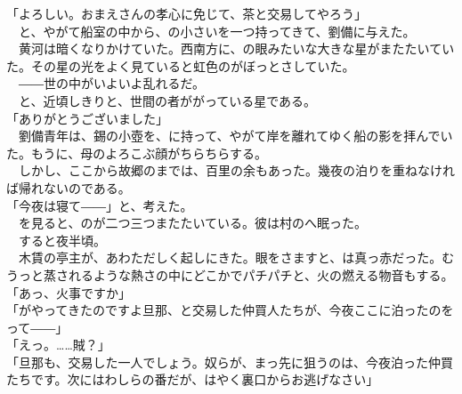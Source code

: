 \documentclass[
  paper=a5,
  fontsize=10pt,
  jafontsize=9.5pt,
  tate,                  %
  open_bracket_pos=nibu, %
]{jlreq}
\begin{document}
「よろしい。おまえさんの孝心に免じて、茶と交易してやろう」\\


　と、やがて船室の中から、の小さいを一つ持ってきて、劉備に与えた。\\


　黄河は暗くなりかけていた。西南方に、の眼みたいな大きな星がまたたいていた。その星の光をよく見ていると虹色のがぼっとさしていた。\\


　――世の中がいよいよ乱れるだ。\\


　と、近頃しきりと、世間の者ががっている星である。\\


「ありがとうございました」\\


　劉備青年は、錫の小壺を、に持って、やがて岸を離れてゆく船の影を拝んでいた。もうに、母のよろこぶ顔がちらちらする。\\


　しかし、ここから故郷のまでは、百里の余もあった。幾夜の泊りを重ねなければ帰れないのである。\\


「今夜は寝て――」と、考えた。\\


　を見ると、のが二つ三つまたたいている。彼は村のへ眠った。\\


　すると夜半頃。\\


　木賃の亭主が、あわただしく起しにきた。眼をさますと、は真っ赤だった。むうっと蒸されるような熱さの中にどこかでパチパチと、火の燃える物音もする。\\


「あっ、火事ですか」\\


「がやってきたのですよ旦那、と交易した仲買人たちが、今夜ここに泊ったのをって――」\\


「えっ。……賊？」\\


「旦那も、交易した一人でしょう。奴らが、まっ先に狙うのは、今夜泊った仲買たちです。次にはわしらの番だが、はやく裏口からお逃げなさい」\\
\end{document}
